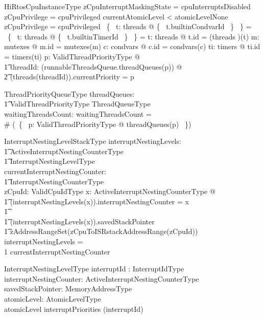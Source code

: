\documentclass[11pt,letterpaper,twoside,openany]{book}
\begin{document}
\begin{schema}{HiRtosCpuInstanceType}
\also
    zCpuInterruptMaskingState = cpuInterruptsDisabled \implies zCpuPrivilege = cpuPrivileged
\also
    currentAtomicLevel < atomicLevelNone \implies zCpuPrivilege = cpuPrivileged
\also
    \bigcap~\{~ t: \ran threads @ \{~ t.builtinCondvarId ~\} ~\} = \emptyset
\also
    \bigcap~\{~ t: \ran threads @ \{~ t.builtinTimerId ~\} ~\} = \emptyset
\also
    \forall t: \ran threads @ t.id = (threads \inv)(t)
\also
    \forall m: \ran mutexes @ m.id = mutexes\inv(m)
\also
    \forall c: \ran condvars @  c.id = condvars\inv(c)
\also
    \forall ti: \ran timers @ ti.id = timers\inv(ti)
\also
    \forall p: ValidThreadPriorityType @ \\
\t1    \forall threadId: \ran (runnableThreadsQueue.threadQueues(p)) @ \\
\t2    (threads(threadId)).currentPriority = p
\end{schema}

\begin{schema}{ThreadPriorityQueueType}
    threadQueues: \\
    \t1 ValidThreadPriorityType \inj ThreadQueueType \\
    waitingThreadsCount: \nat
\where
   waitingThreadsCount = \\
   \# (\bigcup ~\{~ p: ValidThreadPriorityType @ threadQueues(p) ~\})
\end{schema}

\begin{schema}{InterruptNestingLevelStackType}
       interruptNestingLevels: \\
    \t1 ActiveInterruptNestingCounterType \inj \\
    \t1 InterruptNestingLevelType \\
    currentInterruptNestingCounter: \\
    \t1 InterruptNestingCounterType \\
    zCpuId: ValidCpuIdType
\where
   \forall x: ActiveInterruptNestingCounterType @ \\
\t1   (interruptNestingLevels(x)).interruptNestingCounter = x \\
\t1   \land \\
\t1   (interruptNestingLevels(x)).savedStackPointer \in \\
\t1        zAddressRangeSet(zCpuToISRstackAddressRange(zCpuId))
\also
   \dom interruptNestingLevels = \\
   1 \upto currentInterruptNestingCounter
\end{schema}

\begin{schema}{InterruptNestingLevelType}
   interruptId : InterruptIdType \\
   interruptNestingCounter: ActiveInterruptNestingCounterType \\
   savedStackPointer: MemoryAddressType \\
   atomicLevel: AtomicLevelType \\
\where
   atomicLevel \leq interruptPriorities (interruptId)
\also

\end{schema}
\end{document}
